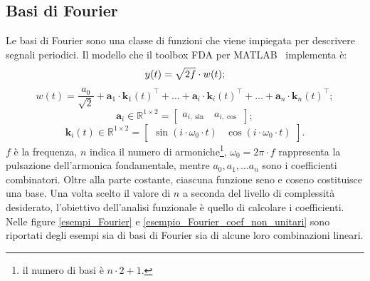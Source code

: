 \subsection[Basi di Fourier]{Basi di Fourier}
Le basi di Fourier sono una classe di funzioni che viene impiegata per descrivere segnali periodici. Il modello che il toolbox FDA per MATLAB~\cite{paper_FDA_toolbox} implementa è:
\[
	y(t) = \sqrt{2f}\cdot w(t)\\;
\]
\[
	w(t) = \frac{a_0}{\sqrt{2}} + \mathbf{a}_1\cdot \mathbf{k}_1(t)^\top +\dots + \mathbf{a}_i\cdot \mathbf{k}_i(t)^\top + \dots + \mathbf{a}_n\cdot \mathbf{k}_n(t)^\top;
\]
\[
	\mathbf{a}_i\in\mathbb{R}^{1\times2} =
	\begin{bmatrix}
		a_{i, \sin} & a_{i, \cos}
	\end{bmatrix};
\]
\[
	\mathbf{k}_i(t)\in\mathbb{R}^{1\times 2} =
	\begin{bmatrix}
		\sin\left(i\cdot\omega_0\cdot t\right) & \cos\left(i\cdot\omega_0\cdot t\right)
	\end{bmatrix}.
\]
$f$ è la frequenza, $n$ indica il numero di armoniche\footnote{il numero di basi è $n\cdot 2 + 1$.}, $\omega_0 = 2\pi\cdot f$ rappresenta la pulsazione dell'armonica fondamentale, mentre $a_0, a_1,\dots a_n$ sono i coefficienti combinatori. Oltre alla parte costante, ciascuna funzione seno e coseno costituisce una base. Una volta scelto il valore di $n$ a seconda del livello di complessità desiderato, l'obiettivo dell'analisi funzionale è quello di calcolare i coefficienti. Nelle figure \ref{esempi_Fourier} e \ref{esempio_Fourier_coef_non_unitari} sono riportati degli esempi sia di basi di Fourier sia di alcune loro combinazioni lineari.

